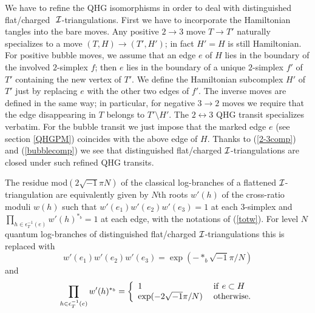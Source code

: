 We have to refine the QHG isomorphisms in order to deal with
distinguished flat/charged  $\ \Ii$-triangulations. First we have to
incorporate the Hamiltonian tangles into the bare moves. Any
positive $2 \to 3$ move $T\to T'$ naturally specializes to a move
$(T,H)\to (T',H')$; in fact $H'=H$ is still Hamiltonian. For
positive bubble moves, we assume that an edge $e$ of $H$ lies in
the boundary of the involved $2$-simplex $f$; then $e$ lies in the
boundary of a unique $2$-simplex $f'$ of $T'$ containing the new
vertex of $T'$. We define the Hamiltonian subcomplex $H'$ of $T'$
just by replacing $e$ with the other two edges of $f'$. The
inverse moves are defined in the same way; in particular, for
negative $3\to 2$ moves we require that the edge disappearing in
$T$ belongs to $T' \setminus H'$. The $2 \leftrightarrow 3$ QHG
transit specializes verbatim. For the bubble transit we just impose
that the marked edge $e$ (see section \ref{QHGPM}) coincides with
the above edge of $H$. Thanks to (\ref{2-3comp}) and
(\ref{bubblecomp}) we see that distinguished flat/charged
${\mathcal I}$-triangulations are closed under such refined QHG transits.

\begin{remark}\label{univfc}{\rm The residue mod$(2\sqrt{-1}\pi N)$ of
the classical log-branches of a flattened ${\mathcal I}$-triangulation are
equivalently given by $N$th roots $w'(h)$ of the cross-ratio moduli
$w(h)$ such that $w'(e_1)w'(e_2)w'(e_3)=1$ at each $3$-simplex and
$\textstyle \prod_{h \in \epsilon_T^{-1}(e)} w'(h)^{*_{b}}=1$ at each
edge, with the notations of (\ref{totw}).  For level $N$ quantum
log-branches of distinguished flat/charged ${\mathcal I}$-triangulations this
is replaced with} $$w'(e_1)w'(e_2)w'(e_3)=\exp(-*_b\sqrt{-1}\pi/N)$$
{\rm and} $$\prod_{h \in \epsilon_T^{-1}(e)} w'(h)^{*_{b}}=\left
\lbrace\begin{array}{l} 1 \\ \exp(-2\sqrt{-1}\pi/N)
\end{array}\right.\begin{array}{l} {\rm if}\ e \subset H\\
{\rm otherwise.}\end{array}$$
\end{remark}

